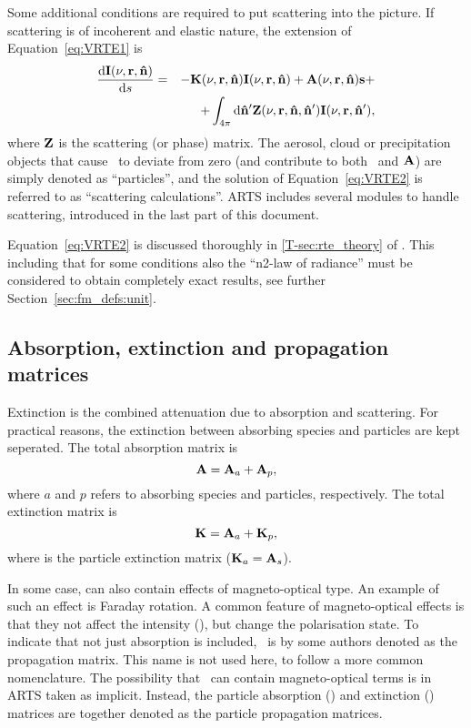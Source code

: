 Some additional conditions are required to put scattering into the picture. If
scattering is of incoherent and elastic nature, the extension of 
Equation~\ref{eq:VRTE1} is
\begin{eqnarray}
  \label{eq:VRTE2}
  \frac {\mathrm{d}{\bf I}(\nu,{\bf r},{\bf \hat{n}})}{\mathrm{d} s} &=&
    -{\bf K}(\nu,{\bf r},{\bf \hat{n}}) {\bf I}(\nu,{\bf r},{\bf \hat{n}}) +
    {\bf A}(\nu,{\bf r},{\bf \hat{n}})\mathbf{s} + \\ \nonumber
    &&+ \int_{4\pi} \mathrm{d}{\bf \hat{n}}' {\bf Z}(\nu,{\bf r},{\bf \hat{n}},{\bf \hat{n}}')
    {\bf I}(\nu,{\bf r},{\bf \hat{n}}'),
\end{eqnarray}
where ${\bf Z}$ is the scattering (or phase) matrix. The aerosol, cloud or
precipitation objects that cause \PhaMat\ to deviate from zero (and contribute
to both \ExtMat\ and ${\bf A}$) are simply denoted as ``particles'', and the
solution of Equation~\ref{eq:VRTE2} is referred to as ``scattering
calculations''. ARTS includes several modules to handle scattering, introduced
in the last part of this document.

Equation~\ref{eq:VRTE2} is discussed thoroughly in \ref{T-sec:rte_theory} of
\theory. This including that for some conditions also the ``n2-law of
radiance'' must be considered to obtain completely exact results, see further
Section~\ref{sec:fm_defs:unit}.



\subsection{Absorption, extinction and propagation matrices}
\label{sec:rteq:propmat}

Extinction is the combined attenuation due to absorption and scattering. For
practical reasons, the extinction between absorbing species and particles are
kept seperated. The total absorption matrix is
\begin{equation}
  \label{eq:absmattotal}
  {\bf A} = {\bf A}_{a} + {\bf A}_{p}, 
\end{equation}
where $a$ and $p$ refers to absorbing species and particles, respectively. The
total extinction matrix is
\begin{equation}
  \label{eq:extmattotal}
  {\bf K} = {\bf A}_{a} + {\bf K}_{p}, 
\end{equation}
where  is the particle extinction matrix
(${\bf K}_{a}={\bf A}_{s}$).

In some case,  can also contain effects of magneto-optical type. An
example of such an effect is Faraday rotation. A common feature of
magneto-optical effects is that they not affect the intensity (\StoI), but
change the polarisation state. To indicate that not just absorption is
included, \AbsMat\ is by some authors denoted as the propagation matrix. This
name is not used here, to follow a more common nomenclature. The possibility
that \AbsMat\ can contain magneto-optical terms is in ARTS taken as implicit.
Instead, the particle absorption () and extinction ()
matrices are together denoted as the particle propagation matrices. 


